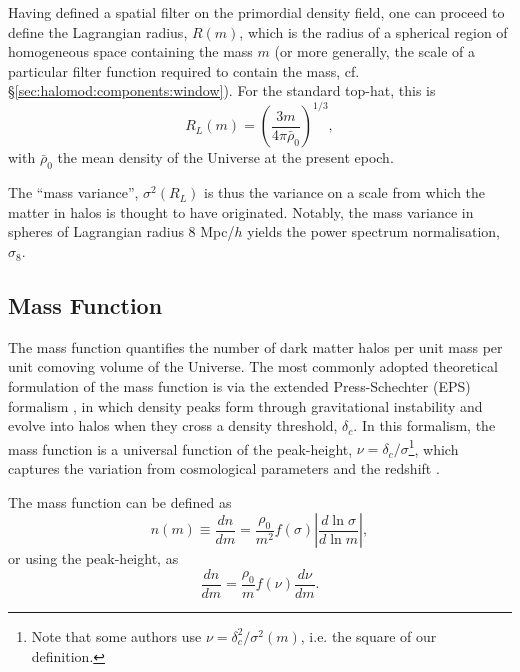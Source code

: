 \documentclass[5p,aas_macros]{elsarticle}
\begin{document}
Having defined a spatial filter on the primordial density field, one can proceed to define the Lagrangian radius, $R(m)$, which is the radius of a spherical region of homogeneous space containing the mass $m$ (or more generally, the scale of a particular filter function required to contain the mass, cf. \S\ref{sec:halomod:components:window}). For the standard top-hat, this is
\begin{equation}
    R_L(m) = \left(\frac{3m}{4\pi\bar{\rho}_0}\right)^{1 / 3},
\end{equation}
with $\bar{\rho}_0$ the mean density of the Universe at the present epoch.

The ``mass variance'', $\sigma^2(R_L)$ is thus the variance on a scale from which the matter in halos is thought to have originated. Notably, the mass variance in spheres of Lagrangian radius 8 Mpc/$h$ yields the power spectrum normalisation, $\sigma_8$.

\subsection{Mass Function}
\label{sec:massfunction}
The mass function quantifies the number of dark matter halos per unit
mass per unit comoving volume of the Universe. 
The most commonly adopted theoretical formulation of the mass function is via the extended Press-Schechter (EPS) formalism \citep{Press1974,Bond1991}, in which density peaks form through gravitational instability and evolve into halos when they cross a density threshold, $\delta_c$. 
In this formalism, the mass function is a universal function of the peak-height, $\nu = \delta_c/\sigma$\footnote{Note that some authors use $\nu = \delta^2_c/\sigma^2(m)$, i.e. the square of our definition.}, which captures the variation from cosmological parameters and the redshift \citep[but note that several recent studies find significant non-universality with redshift, and have provided fits that explicitly account for this departure]{Jenkins2001}. 

The mass function can be defined as
\begin{equation}
\label{eq:hmf}
  n(m) \equiv \frac{dn}{dm} = \frac{\rho_0}{m^2} f(\sigma) \left|\frac{d\ln\sigma}{d\ln m}\right|,
\end{equation}
or using the peak-height, as
\begin{equation}
    \label{eq:theory:hmf_nu}
    \frac{dn}{dm} = \frac{\rho_0}{m} f(\nu) \frac{d \nu}{d m}.
\end{equation}
\end{document}
